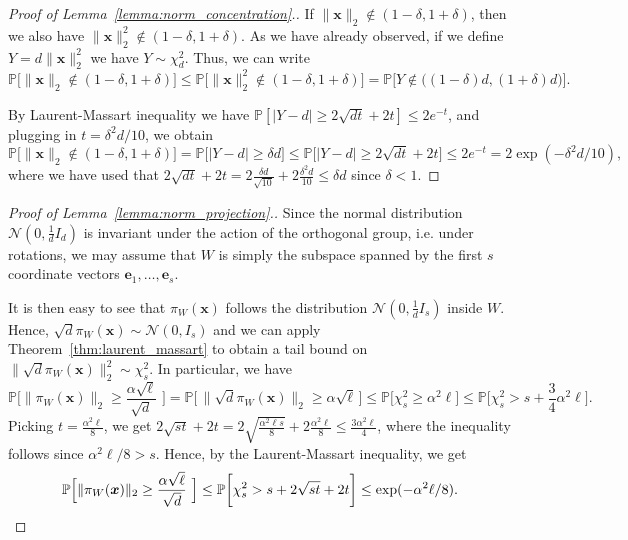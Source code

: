 \documentclass[11pt]{amsart}
\theoremstyle{definition}
\def\cN{\mathcal{N}}
\def\Pb{\mathbb{P}}
\def\be{\boldsymbol{e}}
\def\bx{\boldsymbol{x}}
\begin{document}
\begin{proof}[Proof of Lemma~\ref{lemma:norm_concentration}.]
If $\|\bx\|_2\notin (1-\delta, 1+\delta)$, then we also have $\|\bx\|_2^2\notin (1-\delta, 1+\delta)$. As we have already observed, if we define $Y = d\|\bx\|_2^2$ we have $Y\sim\chi^2_d$.
Thus, we can write
{\smaller[0.3]
\[\Pb\big[\|\bx\|_2\notin (1-\delta, 1+\delta)\big]\leq \Pb\big[\|\bx\|_2^2\notin (1-\delta, 1+\delta)\big]=\Pb\Big[Y\notin \big((1-\delta)d, (1+\delta)d\big)\Big].\]
}

By Laurent-Massart inequality we have $\Pb[|Y-d|\geq 2\sqrt{dt}+2t]\leq 2e^{-t}$,
and plugging in $t=\delta^2d/10$, we obtain
{\smaller[0.3]
\[\Pb\big[\|\bx\|_2\notin (1-\delta, 1+\delta)\big]= \Pb\Big[|Y-d|\geq \delta d\Big]\leq \Pb\Big[|Y-d|\geq 2\sqrt{dt}+2t\Big]\leq 2e^{-t}=2\exp(-\delta^2 d/10),\]
}
where we have used that $2\sqrt{dt}+2t=2\frac{\delta d}{\sqrt{10}}+2\frac{\delta^2 d}{10}\leq \delta d$ since $\delta<1$.
\end{proof}

\begin{proof}[Proof of Lemma~\ref{lemma:norm_projection}.]
Since the normal distribution $\cN(0, \frac{1}{d}I_d)$ is invariant under the action of the orthogonal group, i.e. under rotations, we may assume that $W$ is simply the subspace spanned by the first $s$ coordinate vectors $\be_1, \dots, \be_s$.

It is then easy to see that $\pi_W(\bx)$ follows the distribution $\cN(0, \frac{1}{d}I_s)$ inside $W$. Hence, $\sqrt{d}\pi_W(\bx)\sim \cN(0, I_{s})$ and we can apply Theorem~\ref{thm:laurent_massart} to obtain a tail bound on $\|\sqrt{d}\pi_W(\bx)\|_2^2\sim \chi_s^2$. In particular, we have
{\smaller[0.3]
\[\Pb\Big[\|\pi_W(\bx)\|_2\geq \frac{\alpha\sqrt{\ell}}{\sqrt{d}}\,\,\Big]= \Pb\bigg[\,\Big\|\sqrt{d}\pi_W(\bx)\Big\|_2\geq \alpha\sqrt{\ell}\,\bigg]\leq \Pb\bigg[\chi_s^2\geq \alpha^2 \ell\bigg]\leq \Pb\bigg[\chi_s^2>s+\frac{3}{4}\alpha^2\ell\bigg].\]
}
Picking $t=\frac{\alpha^2 \ell}{8}$, we get $2\sqrt{st}+2t = 2\sqrt{\frac{\alpha^2 \ell s}{8}}+2\frac{\alpha^2 \ell}{8}\leq \frac{3\alpha^2 \ell}{4}$, where the inequality follows since $\alpha^2 \ell/8>s$. Hence, by the Laurent-Massart inequality, we get
{\smaller[0.3]
\[\Pb\Big[\|\pi_W(\bx)\|_2\geq \frac{\alpha\sqrt{\ell}}{\sqrt{d}}\,\,\Big]\leq \Pb\bigg[\chi_s^2>s+2\sqrt{st}+2t\bigg]\leq \exp(-\alpha^2\ell/8).\qedhere\]
}
\end{proof}
\end{document}
